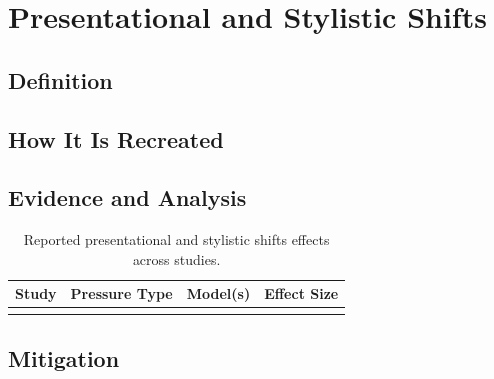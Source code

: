 \section{Presentational and Stylistic Shifts}
\label{sec:presentational_shift}

\subsection{Definition}
\label{sec:presentational_shift_definition}

\subsection{How It Is Recreated}
\label{sec:presentational_shift_elicitation}

\subsection{Evidence and Analysis}
\label{sec:presentational_shift_evidence}

\begin{table}[t]
\centering
\caption{Reported presentational and stylistic shifts effects across studies.}
\label{tab:presentational_shift_evidence}
\begin{tabular}{llll}
\toprule
\textbf{Study} & \textbf{Pressure Type} & \textbf{Model(s)} & \textbf{Effect Size} \\
\midrule
 & & & \\
\bottomrule
\end{tabular}
\end{table}

\subsection{Mitigation}
\label{sec:presentational_shift_mitigation}
